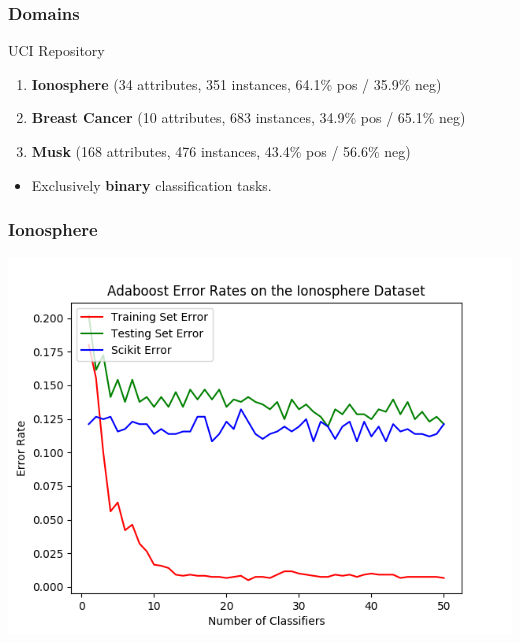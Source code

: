 \documentclass{beamer}
\begin{document}
\begin{frame}
\frametitle{Domains}
\begin{block}{UCI Repository}
\begin{enumerate}
\item \textbf{Ionosphere} {\footnotesize{(34 attributes, 351 instances, 64.1\% pos / 35.9\% neg)}}
\item \textbf{Breast Cancer} {\footnotesize{(10 attributes, 683 instances, 34.9\% pos / 65.1\% neg)}}
\item \textbf{Musk} {\footnotesize{(168 attributes, 476 instances, 43.4\% pos / 56.6\% neg)}}
\end{enumerate}
\end{block}
\begin{itemize}
\item Exclusively \textbf{binary} classification tasks. 
\end{itemize}
\end{frame}
\begin{frame}
\frametitle{Ionosphere}
\begin{center}
\includegraphics[width=0.8\linewidth]{Ionosphere_1.png}
\end{center}
\end{frame}
\end{document}
